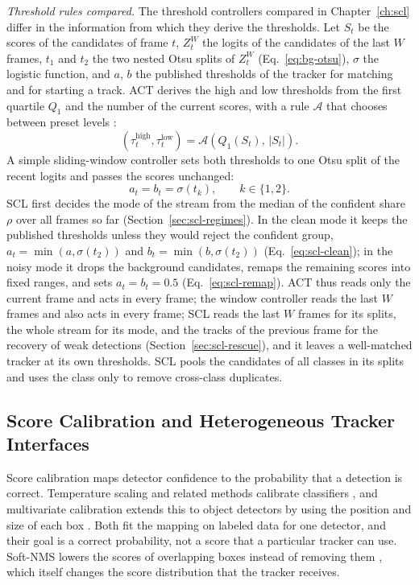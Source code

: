 \emph{Threshold rules compared.} The threshold controllers compared in Chapter~\ref{ch:scl} differ in the information from which they derive the thresholds. Let $S_t$ be the scores of the candidates of frame $t$, $Z_t^W$ the logits of the candidates of the last $W$ frames, $t_1$ and $t_2$ the two nested Otsu splits of $Z_t^W$ (Eq.~\eqref{eq:bg-otsu}), $\sigma$ the logistic function, and $a$, $b$ the published thresholds of the tracker for matching and for starting a track. ACT derives the high and low thresholds from the first quartile $Q_1$ and the number of the current scores, with a rule $\mathcal{A}$ that chooses between preset levels \cite{act2026adaptive}:
\begin{equation}
\left(\tau_t^{\mathrm{high}},\tau_t^{\mathrm{low}}\right)=\mathcal{A}\left(Q_1(S_t),\,|S_t|\right).
\label{eq:rw-act}
\end{equation}
A simple sliding-window controller sets both thresholds to one Otsu split of the recent logits and passes the scores unchanged:
\begin{equation}
a_t=b_t=\sigma(t_k),\qquad k\in\{1,2\}.
\label{eq:rw-window}
\end{equation}
SCL first decides the mode of the stream from the median of the confident share $\rho$ over all frames so far (Section~\ref{sec:scl-regimes}). In the clean mode it keeps the published thresholds unless they would reject the confident group, $a_t=\min(a,\sigma(t_2))$ and $b_t=\min(b,\sigma(t_2))$ (Eq.~\eqref{eq:scl-clean}); in the noisy mode it drops the background candidates, remaps the remaining scores into fixed ranges, and sets $a_t=b_t=0.5$ (Eq.~\eqref{eq:scl-remap}). ACT thus reads only the current frame and acts in every frame; the window controller reads the last $W$ frames and also acts in every frame; SCL reads the last $W$ frames for its splits, the whole stream for its mode, and the tracks of the previous frame for the recovery of weak detections (Section~\ref{sec:scl-rescue}), and it leaves a well-matched tracker at its own thresholds. SCL pools the candidates of all classes in its splits and uses the class only to remove cross-class duplicates.

\subsection{Score Calibration and Heterogeneous Tracker Interfaces}\label{sec:rw-calibration}
Score calibration maps detector confidence to the probability that a detection is correct. Temperature scaling and related methods calibrate classifiers \cite{guo2017calibration}, and multivariate calibration extends this to object detectors by using the position and size of each box \cite{kuppers2020detcalib}. Both fit the mapping on labeled data for one detector, and their goal is a correct probability, not a score that a particular tracker can use. Soft-NMS lowers the scores of overlapping boxes instead of removing them \cite{bodla2017softnms}, which itself changes the score distribution that the tracker receives.

